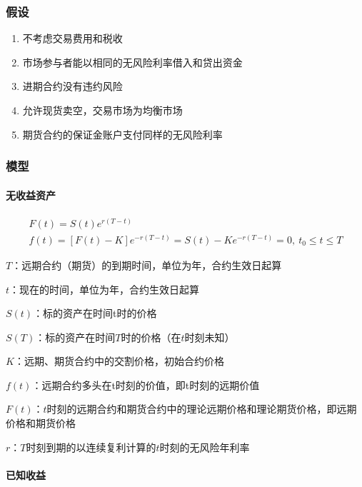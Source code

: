 \documentclass[12pt]{book}
\begin{document}
\subsubsection{假设}

\begin{enumerate}[(1)]
\item	不考虑交易费用和税收
\item	市场参与者能以相同的无风险利率借入和贷出资金
\item	进期合约没有违约风险
\item	允许现货卖空，交易市场为均衡市场
\item	期货合约的保证金账户支付同样的无风险利率
\end{enumerate}		

\subsubsection{模型}

\paragraph{无收益资产}	

\begin{gather*}
  F\left(t\right)=S\left(t\right)e^{r\left(T-t\right)} \\
  f\left(t\right)=\left[F\left(t\right)-K\right]e^{-r\left(T-t\right)}=S\left(t\right)-Ke^{-r\left(T-t\right)}=0,\ t_0\le t\le T
\end{gather*}

\par $T$：远期合约（期货）的到期时间，单位为年，合约生效日起算
\par $t$：现在的时间，单位为年，合约生效日起算
\par $S\left(t\right)$：标的资产在时间t时的价格
\par $S(T)$：标的资产在时间$T$时的价格（在$t$时刻未知）
\par $K$：远期、期货合约中的交割价格，初始合约价格
\par $f\left(t\right)$：远期合约多头在t时刻的价值，即t时刻的远期价值
\par $F\left(t\right)$：$t$时刻的远期合约和期货合约中的理论远期价格和理论期货价格，即远期价格和期货价格
\par $r$：$T$时刻到期的以连续复利计算的$t$时刻的无风险年利率

\paragraph{已知收益}
\end{document}
